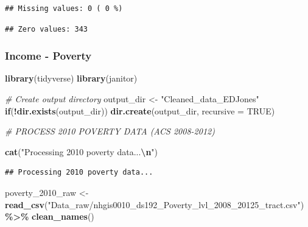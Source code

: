 \documentclass[
]{article}
\newenvironment{Shaded}{\begin{snugshade}}{\end{snugshade}}
\newcommand{\AttributeTok}[1]{\textcolor[rgb]{0.13,0.29,0.53}{#1}}
\newcommand{\CommentTok}[1]{\textcolor[rgb]{0.56,0.35,0.01}{\textit{#1}}}
\newcommand{\ConstantTok}[1]{\textcolor[rgb]{0.56,0.35,0.01}{#1}}
\newcommand{\ControlFlowTok}[1]{\textcolor[rgb]{0.13,0.29,0.53}{\textbf{#1}}}
\newcommand{\FunctionTok}[1]{\textcolor[rgb]{0.13,0.29,0.53}{\textbf{#1}}}
\newcommand{\NormalTok}[1]{#1}
\newcommand{\OtherTok}[1]{\textcolor[rgb]{0.56,0.35,0.01}{#1}}
\newcommand{\SpecialCharTok}[1]{\textcolor[rgb]{0.81,0.36,0.00}{\textbf{#1}}}
\newcommand{\StringTok}[1]{\textcolor[rgb]{0.31,0.60,0.02}{#1}}
\begin{document}
\begin{verbatim}
## Missing values: 0 ( 0 %)
\end{verbatim}

\begin{Shaded}
\end{Shaded}

\begin{verbatim}
## Zero values: 343
\end{verbatim}

\subsubsection{Income - Poverty}\label{income---poverty}

\begin{Shaded}
\begin{Highlighting}[]
\FunctionTok{library}\NormalTok{(tidyverse)}
\FunctionTok{library}\NormalTok{(janitor)}

\CommentTok{\# Create output directory}
\NormalTok{output\_dir }\OtherTok{\textless{}{-}} \StringTok{"Cleaned\_data\_EDJones"}
\ControlFlowTok{if}\NormalTok{(}\SpecialCharTok{!}\FunctionTok{dir.exists}\NormalTok{(output\_dir)) }\FunctionTok{dir.create}\NormalTok{(output\_dir, }\AttributeTok{recursive =} \ConstantTok{TRUE}\NormalTok{)}


\CommentTok{\# PROCESS 2010 POVERTY DATA (ACS 2008{-}2012)}

\FunctionTok{cat}\NormalTok{(}\StringTok{"Processing 2010 poverty data...}\SpecialCharTok{\textbackslash{}n}\StringTok{"}\NormalTok{)}
\end{Highlighting}
\end{Shaded}

\begin{verbatim}
## Processing 2010 poverty data...
\end{verbatim}

\begin{Shaded}
\begin{Highlighting}[]
\NormalTok{poverty\_2010\_raw }\OtherTok{\textless{}{-}} \FunctionTok{read\_csv}\NormalTok{(}\StringTok{"Data\_raw/nhgis0010\_ds192\_Poverty\_lvl\_2008\_20125\_tract.csv"}\NormalTok{) }\SpecialCharTok{\%\textgreater{}\%}
  \FunctionTok{clean\_names}\NormalTok{()}
\end{Highlighting}
\end{Shaded}
\end{document}
